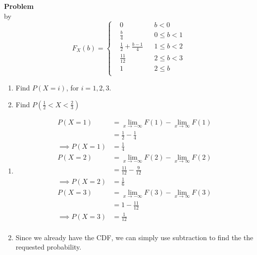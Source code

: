 \documentclass[12pt]{article}
\newenvironment{Ex}{\textbf{Problem}\vspace{.75em}\\}{}
\begin{document}
\begin{enumerate}
\begin{Ex}
    by
    \begin{equation}
      \label{eq:3-question}
      F_X(b) = \left\{
        \begin{aligned}
          & 0 && b<0 \\
          & \frac{b}{4} && 0 \le b < 1 \\
          & \frac{1}{2} + \frac{b-1}{4}  && 1 \le b < 2 \\
          & \frac{11}{12} && 2 \le b < 3 \\
          & 1 && 2 \le b \\
        \end{aligned} \right.
    \end{equation}
    \begin{enumerate}
    \item Find $P(X=i)$, for $i=1,2,3$.
    \item Find $P\left(\frac{1}{2} < X < \frac{2}{3}\right)$
    \end{enumerate}
    \begin{solution} \hfill
      \begin{enumerate}
      \item
        \begin{equation}
          \label{eq:3a-sol}
          \begin{aligned}
            P(X=1) &= \lim_{x\rightarrow-\infty}F(1) -
            \lim_{x\rightarrow\infty}F(1) \\
            &= \frac{1}{2} - \frac{1}{4} \\
            \implies P(X=1) &= \frac{1}{4} \\
            P(X=2) &= \lim_{x\rightarrow-\infty}F(2) -
            \lim_{x\rightarrow\infty}F(2) \\\
            &= \frac{11}{12} - \frac{9}{12} \\
            \implies P(X=2) &= \frac{1}{6} \\
            P(X=3) &= \lim_{x\rightarrow-\infty}F(3) -
            \lim_{x\rightarrow\infty}F(3) \\
            &= 1 - \frac{11}{12} \\
            \implies P(X=3) &= \frac{1}{12} \\
          \end{aligned}
        \end{equation}
      \item Since we already have the CDF, we can simply use
        subtraction to find the the requested probability.
        \begin{equation}

\end{equation}
\end{enumerate}
\end{solution}
\end{Ex}
\end{enumerate}
\end{document}
